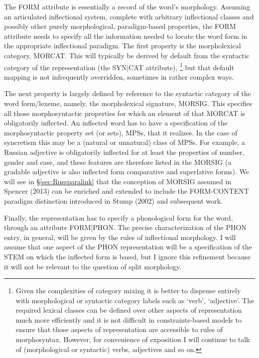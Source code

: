 \documentclass[output=paper,
modfonts
]{LSP/langsci}
\begin{document}
The FORM attribute is essentially a record of the word’s morphology. Assuming an articulated inflectional system, complete with arbitrary inflectional classes and possibly other purely morphological, paradigm-based properties, the FORM attribute needs to specify all the information needed to locate the word form in the appropriate inflectional paradigm. The first property is the morpholexical category, MORCAT. This will typically be derived by default from the syntactic category of the representation (the SYN|CAT attribute),%
\footnote{Given the complexities of category mixing it is better to dispense entirely with morphological or syntactic category labels such as  ‘verb’, ‘adjective’. The required lexical classes can be defined over other aspects of representation much more efficiently and it is not difficult in constraints-based models to ensure that those aspects of representation are accessible to rules of morphosyntax. However, for convenience of exposition I will continue to talk of (morphological or syntactic) verbs, adjectives and so on.}
but that default mapping is not infrequently overridden, sometimes in rather complex ways. 

The next property is largely defined by reference to the syntactic category of the word form/lexeme, namely, the morpholexical signature, MORSIG. This specifies all those morphosyntactic properties  for which an element of that MORCAT is obligatorily inflected. An inflected word has to have a specification of the morphosyntactic property set (or sets), MPSs, that it realizes. In the case of syncretism this may be a (natural or unnatural) class of MPSs. %
For example, a Russian adjective is obligatorily inflected for at least the properties of number, gender and case, and these features are therefore listed in the MORSIG (a gradable adjective is also inflected form comparative and superlative forms). We will see in \S\ref{sec:Russparalink} that the conception of MORSIG assumed in Spencer (2013) can  be enriched and extended to include the FORM-CONTENT paradigm distinction introduced in Stump (2002) and subsequent work.

Finally, the representation has to specify a phonological form for the word, through an  attribute FORM|PHON. The precise characterization of the PHON entry, in general, will be given by the rules of inflectional morphology. I will assume that one aspect of the PHON representation will be a specification of the STEM on which the inflected form is based, but I ignore this refinement because it will not be relevant to the question of split morphology.
\end{document}

